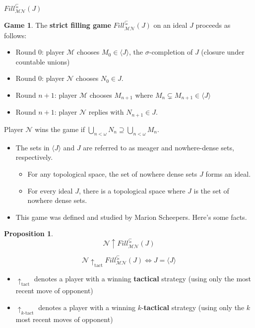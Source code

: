 \documentclass{beamer}
\theoremstyle{theorem}
\newtheorem{proposition}[theorem]{Proposition}
\theoremstyle{definition}
\newtheorem{game}[theorem]{Game}
\newcommand{\win}{\uparrow}
\newcommand{\tactwin}{\uparrow_{\text{tact}}}
\newcommand{\ktactwin}[1]{\uparrow_{#1\text{-tact}}}
\newcommand{\sfillgame}[1]{Fill^{\subsetneq}_{\pl M\pl N}(#1)}
\newcommand{\<}{\langle}
\renewcommand{\>}{\rangle}
\newcommand{\pl}[1]{\mathscr{#1}}
\begin{document}
\begin{frame}{$\sfillgame{J}$}
  \begin{game} 
      The \textbf{strict filling game} $\sfillgame{J}$ on an ideal $J$ proceeds as follows:
        \begin{itemize}
          \item Round 0: player $\pl M$ chooses $M_0 \in \<J\>$, the $\sigma$-completion of $J$ (closure under countable unions)
          \item Round 0: player $\pl N$ chooses $N_0\in J$. 
          \item Round $n+1$: player $\pl M$ chooses $M_{n+1}$ where $M_n\subsetneq M_{n+1}\in\<J\>$
          \item Round $n+1$: player $\pl N$ replies with $N_{n+1}\in J$. 
        \end{itemize}
      Player $\pl N$ wins the game if $\bigcup_{n<\omega} N_n \supseteq \bigcup_{n<\omega} M_n$. 
  \end{game}
\end{frame}

\begin{frame}
  \begin{itemize}
    \item
      The sets in $\<J\>$ and $J$ are referred to as meager and nowhere-dense sets, respectively.
      \begin{itemize}
        \item For any topological space, the set of nowhere dense sets $J$ forms an ideal. 
        \item For every ideal $J$, there is a topological space where $J$ is the set of nowhere dense sets.
      \end{itemize}
    \pause
    \item
      This game was defined and studied by Marion Scheepers. Here's some facts.
  \end{itemize}
  \begin{proposition}
    \[\pl N\win\sfillgame{J}\]
  \end{proposition}
\end{frame}

\begin{frame}
  
  \begin{theorem}
    \[\pl N\tactwin\sfillgame{J} \Leftrightarrow J=\<J\>\]
  \end{theorem}

{\small
\begin{itemize}
  \item $\tactwin$ denotes a player with a winning \textbf{tactical} strategy (using only the most recent move of opponent)
  \item $\ktactwin{k}$ denotes a player with a winning $k$-\textbf{tactical} strategy (using only the $k$ most recent moves of opponent)
\end{itemize}
}
\end{frame}
\end{document}

